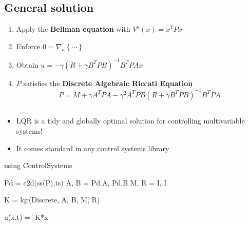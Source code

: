 \documentclass[
  letterpaper,
  DIV=11,
  numbers=noendperiod,
  oneside]{scrartcl}
\newenvironment{Shaded}{\begin{snugshade}}{\end{snugshade}}
\newcommand{\BuiltInTok}[1]{\textcolor[rgb]{0.00,0.23,0.31}{#1}}
\newcommand{\FunctionTok}[1]{\textcolor[rgb]{0.28,0.35,0.67}{#1}}
\newcommand{\ImportTok}[1]{\textcolor[rgb]{0.00,0.46,0.62}{#1}}
\newcommand{\NormalTok}[1]{\textcolor[rgb]{0.00,0.23,0.31}{#1}}
\newcommand{\OperatorTok}[1]{\textcolor[rgb]{0.37,0.37,0.37}{#1}}
\providecommand{\tightlist}{%
  \setlength{\itemsep}{0pt}\setlength{\parskip}{0pt}}\usepackage{longtable,booktabs,array}
\begin{document}
\subsection{General solution}\label{general-solution-4}

\begin{enumerate}
\def\labelenumi{\arabic{enumi}.}
\tightlist
\item
  Apply the \textbf{Bellman equation} with \(V^\star (x) = x^T P x\)
\item
  Enforce \(0 = \nabla_u \left\{ \cdots \right\}\)
\item
  Obtain
  \(u = - \gamma \left( R + \gamma B^T P B \right)^{-1} B^T P A x\)
\item
  \(P\) satisfies the \textbf{Discrete Algebraic Riccati Equation}
  \[P = M + \gamma A^T P A - \gamma^2 A^T P B \left( R + \gamma B^T P B \right)^{-1} B^T P A\]
\end{enumerate}

\subsection{}\label{section-24}

\begin{itemize}
\item
  LQR is a tidy and globally optimal solution for controlling
  multivariable systems!
\item
  It comes standard in any control systems library
\end{itemize}

\begin{Shaded}
\begin{Highlighting}[numbers=left,,]
\ImportTok{using} \BuiltInTok{ControlSystems}

\NormalTok{Pd }\OperatorTok{=} \FunctionTok{c2d}\NormalTok{(}\FunctionTok{ss}\NormalTok{(P),ts)}
\NormalTok{A, B }\OperatorTok{=}\NormalTok{ Pd.A, Pd.B}
\NormalTok{M, R }\OperatorTok{=}\NormalTok{ I, I}

\NormalTok{K }\OperatorTok{=} \FunctionTok{lqr}\NormalTok{(Discrete, A, B, M, R)}

\FunctionTok{u}\NormalTok{(x,t)  }\OperatorTok{=} \OperatorTok{{-}}\NormalTok{K}\OperatorTok{*}\NormalTok{x}
\end{Highlighting}
\end{Shaded}

\end{document}
